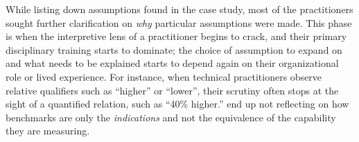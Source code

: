 While listing down assumptions found in the case study, most of the practitioners sought further clarification on \textit{why} particular assumptions were made. This phase is when the interpretive lens of a practitioner begins to crack, and their primary disciplinary training starts to dominate; the choice of assumption to expand on and what needs to be explained starts to depend again on their organizational role or lived experience. For instance, when technical practitioners observe relative qualifiers such as ``higher'' or ``lower'', their scrutiny often stops at the sight of a quantified relation, such as ``40\% higher.''  end up not reflecting on how benchmarks are only the \textit{indications} and not the equivalence of the capability they are measuring. 

\begin{quote}
    \textit{}
\end{quote}



